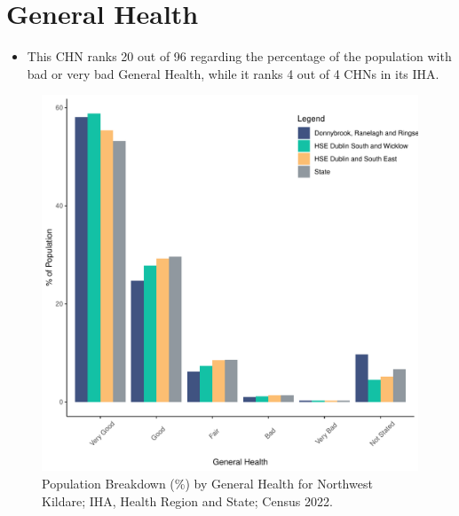 \documentclass{article}
\begin{document}
\pagebreak

\section{General Health}\label{sect:GenHealth}
\begin{itemize}
\item  This CHN ranks  20 out of 96 regarding the percentage of the population with bad or very bad General Health, while it ranks   4 out of 4 CHNs in its IHA.
\end{itemize}
\begin{figure}[h]
	\centering
	\includegraphics[width = 150mm]{../figures/GenED.pdf}
	\caption{Population Breakdown (\%) by General Health for Northwest Kildare; IHA, Health Region and State;  Census 2022.}
	\label{fig:2ae19629-1a6a-13a3-e055-000000000001}
	\end{figure}
\end{document}
